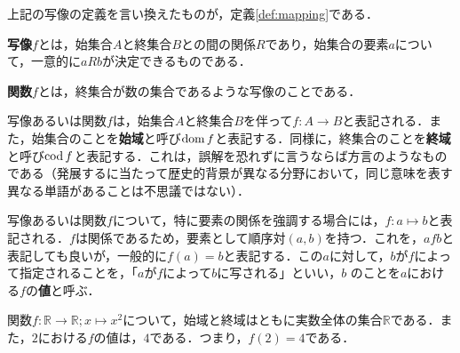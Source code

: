 上記の写像の定義を言い換えたものが，定義\ref{def:mapping}である．
\begin{definition}[写像] %
	\label{def:mapping}
	\textbf{写像}$f$とは，始集合$A$と終集合$B$との間の関係$R$であり，始集合の要素$a$について，一意的に$aRb$が決定できるものである．
\end{definition}
\begin{definition}[関数] %
	\textbf{関数}$f$とは，終集合が数の集合であるような写像のことである．
\end{definition}
\begin{rem*}
	写像あるいは関数$f$は，始集合$A$と終集合$B$を伴って$f : A \rightarrow B$と表記される．また，始集合のことを\textbf{始域}と呼び$\operatorname{dom} f$と表記する．同様に，終集合のことを\textbf{終域}と呼び$\operatorname{cod} f$と表記する．これは，誤解を恐れずに言うならば方言のようなものである（発展するに当たって歴史的背景が異なる分野において，同じ意味を表す異なる単語があることは不思議ではない）．
\end{rem*}
\begin{rem*}
	写像あるいは関数$f$について，特に要素の関係を強調する場合には，$f : a \mapsto b$と表記される．$f$は関係であるため，要素として順序対$(a,b)$を持つ．これを，$afb$と表記しても良いが，一般的に$f(a) = b$と表記する．この$a$に対して，$b$が$f$によって指定されることを，「$a$が$f$によって$b$に写される」といい，$b$	のことを$a$における$f$の\textbf{値}と呼ぶ．
\end{rem*}
\begin{example*}
	関数$f : \mathbb{R} \rightarrow \mathbb{R}; x \mapsto x^2$について，始域と終域はともに実数全体の集合$\mathbb{R}$である．また，$2$における$f$の値は，$4$である．つまり，$f(2) = 4$である．
\end{example*}

